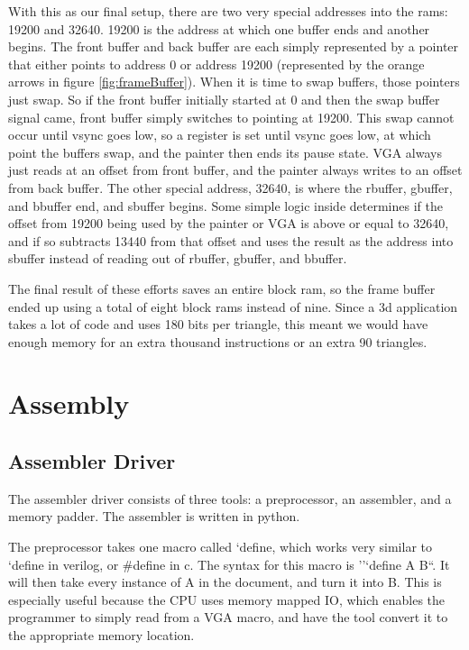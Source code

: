 \documentclass[onecolumn]{IEEEtran}
\begin{document}
With this as our final setup, there are two very special addresses into the rams: 19200 and 32640.  19200 is the address at which one buffer ends and another begins.  The front buffer and back buffer are each simply represented by a pointer that either points to address 0 or address 19200 (represented by the orange arrows in figure \ref{fig:frameBuffer}).  When it is time to swap buffers, those pointers just swap.  So if the front buffer initially started at 0 and then the swap buffer signal came, front buffer simply switches to pointing at 19200.  This swap cannot occur until vsync goes low, so a register is set until vsync goes low, at which point the buffers swap, and the painter then ends its pause state.  VGA always just reads at an offset from front buffer, and the painter always writes to an offset from back buffer.  The other special address, 32640, is where the rbuffer, gbuffer, and bbuffer end, and sbuffer begins.  Some simple logic inside determines if the offset from 19200 being used by the painter or VGA is above or equal to 32640, and if so subtracts 13440 from that offset and uses the result as the address into sbuffer instead of reading out of rbuffer, gbuffer, and bbuffer.

The final result of these efforts saves an entire block ram, so the frame buffer ended up using a total of eight block rams instead of nine.  Since a 3d application takes a lot of code and uses 180 bits per triangle, this meant we would have enough memory for an extra thousand instructions or an extra 90 triangles.

\section{Assembly}
\subsection{Assembler Driver}
The assembler driver consists of three tools: a preprocessor, an assembler, and a memory padder. The assembler is written in python.

The preprocessor takes one macro called `define, which works very similar to `define in verilog, or \#define in c.   The syntax for this macro is ''`define A B``. It will then take every instance of A in the document, and turn it into B.  This is especially useful because the CPU uses memory mapped IO, which enables the programmer to simply read from a VGA macro, and have the tool convert it to the appropriate memory location.
\end{document}
